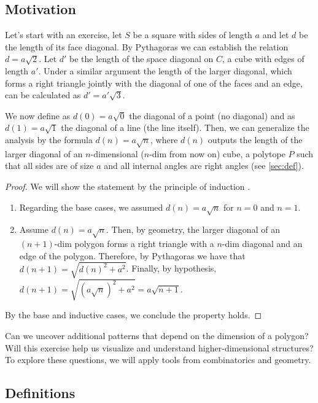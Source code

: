 \documentclass{article}
\begin{document}
	\subsection{Motivation}
	
	Let's start with an exercise, let $S$ be a square \cite{euclid} with sides of length $a$ and let $d$ be the length of its face diagonal. By Pythagoras \cite{euclid} we can establish the relation $d=a\sqrt{2}$. Let $d'$ be the length of the space diagonal on $C$, a cube \cite{euclid} with edges of length $a'$. Under a similar argument the length of the larger diagonal, which forms a right triangle jointly with the diagonal of one of the faces and an edge, can be calculated as $d'=a'\sqrt{3}$.
	
	We now define as $d(0) = a\sqrt{0}$ the diagonal of a point (no diagonal) and as $d(1) = a\sqrt{1}$ the diagonal of a line (the line itself). Then, we can generalize the analysis by the formula $d(n) = a\sqrt{n}$, where $d(n)$ outputs the length of the larger diagonal of an $n$-dimensional ($n$-dim from now on) cube, a polytope $P$ such that all sides are of size $a$ and all internal angles are right angles \cite{coxeter1973regular} (see \autoref{sec:def}).

	\begin{proof}
		We will show the statement by the principle of induction \cite{rosen2011discrete}.
		\begin{enumerate}
			\item Regarding the base cases, we assumed $d(n)=a\sqrt{n}$ for $n=0$ and $n=1$.
			
			\item Assume $d(n)=a\sqrt{n}$. Then, by geometry, the larger diagonal of an $(n+1)$-dim polygon forms a right triangle with a $n$-dim diagonal and an edge of the polygon. Therefore, by Pythagoras we have that $d(n+1) = \sqrt{d(n)^2 + a^2}$. Finally, by hypothesis, $d(n+1) = \sqrt{(a\sqrt{n})^2 + a^2} = a \sqrt{n + 1}$.
		\end{enumerate}
		By the base and inductive cases, we conclude the property holds.
	\end{proof}

	Can we uncover additional patterns that depend on the dimension of a polygon? Will this exercise help us visualize and understand higher-dimensional structures? To explore these questions, we will apply tools from combinatorics and geometry.

	
	\subsection{Definitions \label{sec:def}}
	
\end{document}
